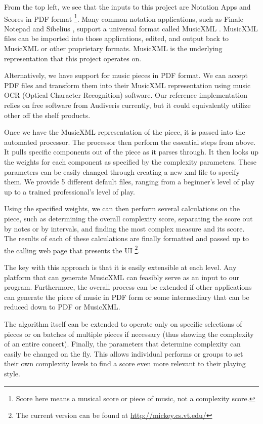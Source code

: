 \documentclass[10pt,preprint]{sigplanconf}
\begin{document}
{From the top left, we see that the inputs to this project are Notation Apps and Scores in PDF format \footnote{Score here means a musical score or piece of music, not a complexity score.}. Many common notation applications, such as Finale Notepad \cite{FinaleNotepad} and Sibelius \cite{Sibelius}, support a universal format called MusicXML \cite{MusicXML}. MusicXML files can be imported into those applications, edited, and output back to MusicXML or other proprietary formats. MusicXML is the underlying representation that this project operates on.

Alternatively, we have support for music pieces in PDF format. We can accept PDF files and transform them into their MusicXML representation using music OCR (Optical Character Recognition) software. Our reference implementation relies on free software from Audiveris \cite{Audiveris} currently, but it could equivalently utilize other off the shelf products.

Once we have the MusicXML representation of the piece, it is passed into the automated processor. The processor then perform the essential steps from above. It pulls specific components out of the piece as it parses through. It then looks up the weights for each component as specified by the complexity parameters. These parameters can be easily changed through creating a new xml file to specify them. We provide 5 different default files, ranging from a beginner's level of play up to a trained professional's level of play.

Using the specified weights, we can then perform several calculations on the piece, such as determining the overall complexity score, separating the score out by notes or by intervals, and finding the most complex measure and its score. The results of each of these calculations are finally formatted and passed up to the calling web page that presents the UI \footnote{The current version can be found at \url{http://mickey.cs.vt.edu/}}.

The key with this approach is that it is easily extensible at each level. Any platform that can generate MusicXML can feasibly serve as an input to our program. Furthermore, the overall process can be extended if other applications can generate the piece of music in PDF form or some intermediary that can be reduced down to PDF or MusicXML.

The algorithm itself can be extended to operate only on specific selections of pieces or on batches of multiple pieces if necessary (thus showing the complexity of an entire concert). Finally, the parameters that determine complexity can easily be changed on the fly. This allows individual performs or groups to set their own complexity levels to find a score even more relevant to their playing style.


}
\end{document}
